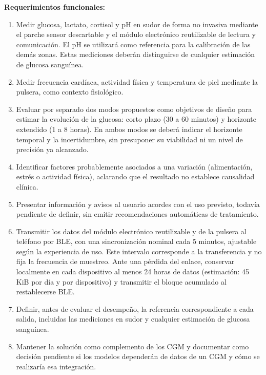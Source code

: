 \noindent\textbf{Requerimientos funcionales:}
\begin{enumerate}
    \item Medir glucosa, lactato, cortisol y pH en sudor de forma no invasiva mediante el parche sensor descartable y el módulo electrónico reutilizable de lectura y comunicación. El pH se utilizará como referencia para la calibración de las demás zonas. Estas mediciones deberán distinguirse de cualquier estimación de glucosa sanguínea.
    \item Medir frecuencia cardíaca, actividad física y temperatura de piel mediante la pulsera, como contexto fisiológico.
    \item Evaluar por separado dos modos propuestos como objetivos de diseño para estimar la evolución de la glucosa: corto plazo (30 a 60 minutos) y horizonte extendido (1 a 8 horas). En ambos modos se deberá indicar el horizonte temporal y la incertidumbre, sin presuponer su viabilidad ni un nivel de precisión ya alcanzado.
    \item Identificar factores probablemente asociados a una variación (alimentación, estrés o actividad física), aclarando que el resultado no establece causalidad clínica.
    \item Presentar información y avisos al usuario acordes con el uso previsto, todavía pendiente de definir, sin emitir recomendaciones automáticas de tratamiento.
    \item Transmitir los datos del módulo electrónico reutilizable y de la pulsera al teléfono por BLE, con una sincronización nominal cada 5 minutos, ajustable según la experiencia de uso. Este intervalo corresponde a la transferencia y no fija la frecuencia de muestreo. Ante una pérdida del enlace, conservar localmente en cada dispositivo al menos 24 horas de datos (estimación: 45 KiB por día y por dispositivo) y transmitir el bloque acumulado al restablecerse BLE.
    \item Definir, antes de evaluar el desempeño, la referencia correspondiente a cada salida, incluidas las mediciones en sudor y cualquier estimación de glucosa sanguínea.
    \item Mantener la solución como complemento de los CGM y documentar como decisión pendiente si los modelos dependerán de datos de un CGM y cómo se realizaría esa integración.
\end{enumerate}

